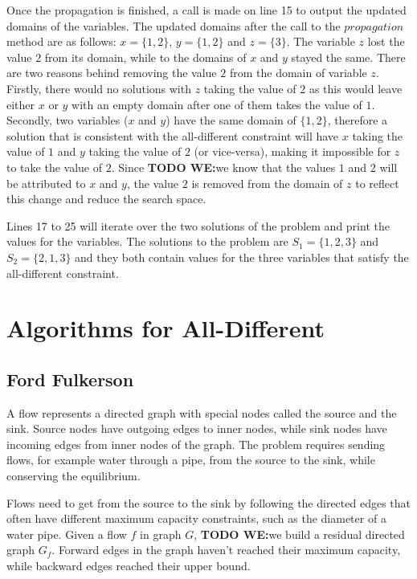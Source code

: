 \documentclass{l4proj}
\begin{document}
\noindent Once the propagation is finished, a call is made on line 15 to output the updated domains of the variables. The updated domains after the call to the $propagation$ method are as follows: $x = \{1, 2\}$, $y = \{1, 2\}$ and $z = \{3\}$. The variable $z$ lost the value $2$ from its domain, while to the domains of $x$ and $y$ stayed the same. There are two reasons behind removing the value $2$ from the domain of variable $z$. Firstly, there would no solutions with $z$ taking the value of $2$ as this would leave either $x$ or $y$ with an empty domain after one of them takes the value of $1$. Secondly, two variables ($x$ and $y$) have the same domain of $\{1, 2\}$, therefore a solution that is consistent with the all-different constraint will have $x$ taking the value of $1$ and $y$ taking the value of $2$ (or vice-versa), making it impossible for $z$ to take the value of $2$.  Since \textbf{TODO WE:}we know that the values $1$ and $2$ will be attributed to $x$ and $y$, the value $2$ is removed from the domain of $z$ to reflect this change and reduce the search space.

\noindent Lines 17 to 25 will iterate over the two solutions of the problem and print the values for the variables. The solutions to the problem are $S_1 = \{1, 2, 3\}$ and $S_2 = \{2, 1, 3\}$ and they both contain values for the three variables that satisfy the all-different constraint.

\chapter{Algorithms for All-Different}
\label{chap4alldiffalgos}

\section{Ford Fulkerson}
\label{ffsection}
\noindent A flow represents a directed graph with special nodes called the source and the sink. Source nodes have outgoing edges to inner nodes, while sink nodes have incoming edges from inner nodes of the graph. The problem requires sending flows, for example water through a pipe, from the source to the sink, while conserving the equilibrium.

\noindent Flows need to get from the source to the sink by following the directed edges that often have different maximum capacity constraints, such as the diameter of a water pipe. Given a flow $f$ in graph $G$, \textbf{TODO WE:}we build a residual directed graph $G_f$. Forward edges in the graph haven’t reached their maximum capacity, while backward edges reached their upper bound. 
\end{document}
